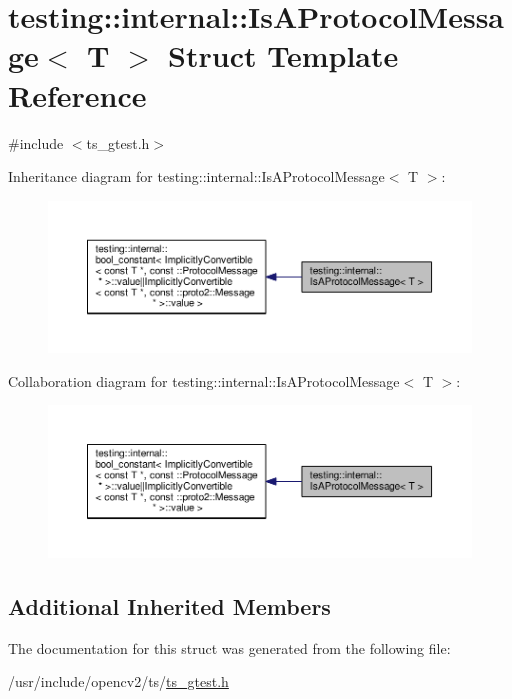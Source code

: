 \hypertarget{structtesting_1_1internal_1_1IsAProtocolMessage}{\section{testing\-:\-:internal\-:\-:Is\-A\-Protocol\-Message$<$ T $>$ Struct Template Reference}
\label{structtesting_1_1internal_1_1IsAProtocolMessage}
}


{\ttfamily \#include $<$ts\-\_\-gtest.\-h$>$}



Inheritance diagram for testing\-:\-:internal\-:\-:Is\-A\-Protocol\-Message$<$ T $>$\-:\nopagebreak
\begin{figure}[H]
\begin{center}
\leavevmode
\includegraphics[width=350pt]{structtesting_1_1internal_1_1IsAProtocolMessage__inherit__graph}
\end{center}
\end{figure}


Collaboration diagram for testing\-:\-:internal\-:\-:Is\-A\-Protocol\-Message$<$ T $>$\-:\nopagebreak
\begin{figure}[H]
\begin{center}
\leavevmode
\includegraphics[width=350pt]{structtesting_1_1internal_1_1IsAProtocolMessage__coll__graph}
\end{center}
\end{figure}
\subsection*{Additional Inherited Members}


The documentation for this struct was generated from the following file\-:\begin{DoxyCompactItemize}
\item 
/usr/include/opencv2/ts/\hyperlink{ts__gtest_8h}{ts\-\_\-gtest.\-h}\end{DoxyCompactItemize}

